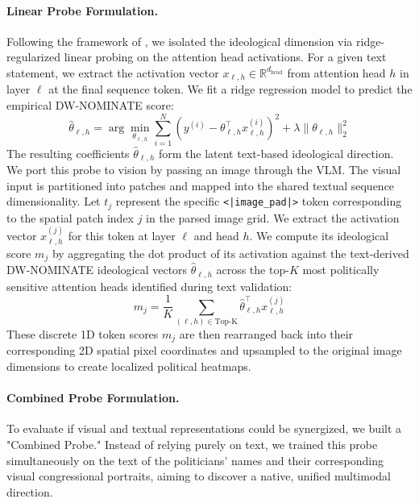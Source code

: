 \documentclass{article}
\begin{document}
\paragraph{Linear Probe Formulation.}
Following the framework of \citet{kimLinearRepresentationsPolitical2025}, we isolated the ideological dimension via ridge-regularized linear probing on the attention head activations. For a given text statement, we extract the activation vector $x_{\ell,h} \in \mathbb{R}^{d_{\text{head}}}$ from attention head $h$ in layer $\ell$ at the final sequence token. We fit a ridge regression model to predict the empirical DW-NOMINATE score:
\begin{equation}
    \hat{\theta}_{\ell,h} = \arg\min_{\theta_{\ell,h}} \sum_{i=1}^{N} \left( y^{(i)} - \theta_{\ell,h}^\top x_{\ell,h}^{(i)} \right)^2 + \lambda \|\theta_{\ell,h}\|_2^2
\end{equation}
The resulting coefficients $\hat{\theta}_{\ell,h}$ form the latent text-based ideological direction. We port this probe to vision by passing an image through the VLM. The visual input is partitioned into patches and mapped into the shared textual sequence dimensionality. Let $t_j$ represent the specific \texttt{<|image\_pad|>} token corresponding to the spatial patch index $j$ in the parsed image grid. We extract the activation vector $x_{\ell,h}^{(j)}$ for this token at layer $\ell$ and head $h$. We compute its ideological score $m_j$ by aggregating the dot product of its activation against the text-derived DW-NOMINATE ideological vectors $\hat{\theta}_{\ell,h}$ across the top-$K$ most politically sensitive attention heads identified during text validation:
\begin{equation}
    m_{j} = \frac{1}{K} \sum_{(\ell,h) \in \text{Top-K}} \hat{\theta}_{\ell,h}^\top x_{\ell,h}^{(j)}
\end{equation}
These discrete 1D token scores $m_j$ are then rearranged back into their corresponding 2D spatial pixel coordinates and upsampled to the original image dimensions to create localized political heatmaps.

\paragraph{Combined Probe Formulation.} To evaluate if visual and textual representations could be synergized, we built a "Combined Probe." Instead of relying purely on text, we trained this probe simultaneously on the text of the politicians' names and their corresponding visual congressional portraits, aiming to discover a native, unified multimodal direction.
\end{document}
